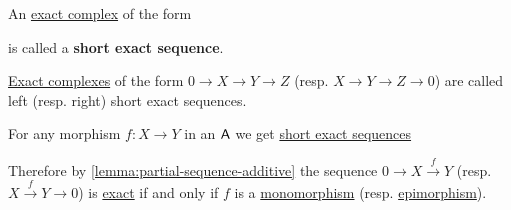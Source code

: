 \documentclass[../../../main]{subfiles}
\begin{document}
\begin{definition} \label{def:short-exact-sequence}
  An \hyperref[def:exact-complex]{exact complex} of the form
  \begin{center}
  \end{center}
  is called a \textbf{short exact sequence}.

  \hyperref[def:exact-complex]{Exact complexes} of the form \(0 \to X \to Y \to Z\) (resp. \(X \to Y \to  Z \to 0\)) are called left (resp. right) short exact sequences.
\end{definition}


\begin{remark} \label{remark:exactness-mono-epi}
  For any morphism \(f: X \to Y\) in an \(\mathsf{A}\) we get \hyperref[def:short-exact-sequence]{short exact sequences}
  \begin{center}
  \end{center}

  Therefore by \autoref{lemma:partial-sequence-additive} the sequence \(0 \to X \xrightarrow{f} Y\) (resp. \(X \xrightarrow{f} Y \to 0\)) is \hyperref[def:exact-sequence]{exact} if and only if \(f\) is a \hyperref[def:mono-epi-morphism]{monomorphism} (resp. \hyperref[def:mono-epi-morphism]{epimorphism}).
\end{remark}
\end{document}

